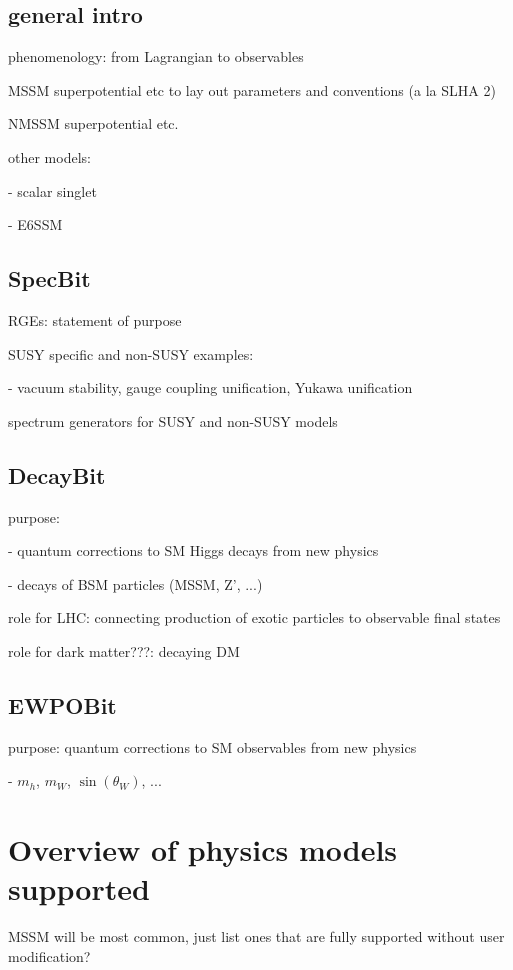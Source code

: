 \documentclass[11pt,a4paper]{article}
\begin{document}
\subsection{general intro}

phenomenology: from Lagrangian to observables

MSSM superpotential etc to lay out parameters and conventions (a la SLHA 2)

NMSSM superpotential etc.

other models:

- scalar singlet

- E6SSM


\subsection{SpecBit}

RGEs: statement of purpose

SUSY specific and non-SUSY examples:

- vacuum stability, gauge coupling unification, Yukawa unification

spectrum generators for SUSY and non-SUSY models
 
 
\subsection{DecayBit}

purpose: 

- quantum corrections to SM Higgs decays from new physics

- decays of BSM particles (MSSM, Z', ...)

role for LHC: connecting production of exotic particles to observable final states

role for dark matter???: decaying DM


\subsection{EWPOBit}

purpose: quantum corrections to SM observables from new physics

- $m_h$, $m_W$, $\sin(\theta_W)$, ...


\section{Overview of physics models supported}

MSSM will be most common, just list ones that are fully supported without user modification?
\end{document}

